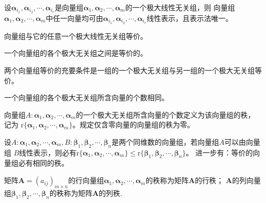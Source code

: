 \begin{theorem}
    设$\boldsymbol{\alpha}_{i_1},\boldsymbol{\alpha}_{i_2},\cdots,\boldsymbol{\alpha}_{i_r}$是向量组$\boldsymbol{\alpha}_1,\boldsymbol{\alpha}_2,\cdots,\boldsymbol{\alpha}_m$的一个极大线性无关组，则
    向量组$\boldsymbol{\alpha}_1,\boldsymbol{\alpha}_2,\cdots,\boldsymbol{\alpha}_m$中任一向量均可由$\boldsymbol{\alpha}_{i_1},\boldsymbol{\alpha}_{i_2},\cdots,\boldsymbol{\alpha}_{i_r}$线性表示，且表示法唯一。
\end{theorem}

\begin{theorem}
    向量组与它的任意一个极大线性无关组等价。
\end{theorem}

\begin{theorem}
    一个向量组的各个极大无关组之间是等价的。
\end{theorem}

\begin{theorem}
    两个向量组等价的充要条件是一组的一个极大无关组与另一组的一个极大无关组等价。
\end{theorem}

\begin{theorem}
    一个向量组的各个极大无关组所含向量的个数相同。
\end{theorem}

\begin{definition}[向量组的秩]
    向量组$A:\boldsymbol{\alpha}_1,\boldsymbol{\alpha}_2,\cdots,\boldsymbol{\alpha}_m$的一个极大无关组所含向量的个数定义为该{\heiti 向量组的秩}，记为
    $\mathrm{r}\{\boldsymbol{\alpha}_1,\boldsymbol{\alpha}_2,\cdots,\boldsymbol{\alpha}_m\}$。规定仅含零向量的向量组的秩为零。
\end{definition}

\begin{definition}
    设$A:\boldsymbol{\alpha}_1,\boldsymbol{\alpha}_2,\cdots,\boldsymbol{\alpha}_m,B:\boldsymbol{\beta}_1,\boldsymbol{\beta}_2,\cdots,\boldsymbol{\beta}_n$是两个同维数的向量组，若向量组$A$可以由向量组
    $B$线性表示，则必有$\mathrm{r}\{\boldsymbol{\alpha}_1,\boldsymbol{\alpha}_2,\cdots,\boldsymbol{\alpha}_m\}\leq \mathrm{r}\{\boldsymbol{\beta}_1,\boldsymbol{\beta}_2,\cdots,\boldsymbol{\beta}_n\}$。
    进一步有：等价的向量组必有相同的秩。
\end{definition}

\begin{definition}
    矩阵$\boldsymbol{A}={(a_{ij})}_{m\times n}$的行向量组$\boldsymbol{\alpha}_1,\boldsymbol{\alpha}_2,\cdots,\boldsymbol{\alpha}_m$的秩称为矩阵$\boldsymbol{A}$的{\heiti 行秩}；
    $\boldsymbol{A}$的列向量组$\boldsymbol{\beta}_1,\boldsymbol{\beta}_2,\cdots,\boldsymbol{\beta}_n$的秩称为矩阵$\boldsymbol{A}$的{\heiti 列秩}.
\end{definition}

